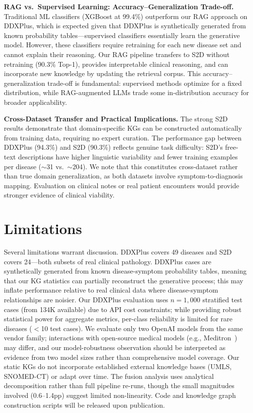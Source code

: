 \documentclass[runningheads]{llncs}
\begin{document}
\textbf{RAG vs.\ Supervised Learning: Accuracy--Generalization Trade-off.}
Traditional ML classifiers (XGBoost at 99.4\%) outperform our RAG approach on DDXPlus, which is expected given that DDXPlus is synthetically generated from known probability tables---supervised classifiers essentially learn the generative model. However, these classifiers require retraining for each new disease set and cannot explain their reasoning. Our RAG pipeline transfers to S2D without retraining (90.3\% Top-1), provides interpretable clinical reasoning, and can incorporate new knowledge by updating the retrieval corpus. This accuracy--generalization trade-off is fundamental: supervised methods optimize for a fixed distribution, while RAG-augmented LLMs trade some in-distribution accuracy for broader applicability.

\textbf{Cross-Dataset Transfer and Practical Implications.}
The strong S2D results demonstrate that domain-specific KGs can be constructed automatically from training data, requiring no expert curation. The performance gap between DDXPlus (94.3\%) and S2D (90.3\%) reflects genuine task difficulty: S2D's free-text descriptions have higher linguistic variability and fewer training examples per disease (${\sim}$31 vs.\ ${\sim}$204). We note that this constitutes cross-dataset rather than true domain generalization, as both datasets involve symptom-to-diagnosis mapping. Evaluation on clinical notes or real patient encounters would provide stronger evidence of clinical viability.

\section{Limitations}
\label{sec:limitations}

Several limitations warrant discussion. DDXPlus covers 49 diseases and S2D covers 24---both subsets of real clinical pathology. DDXPlus cases are synthetically generated from known disease-symptom probability tables, meaning that our KG statistics can partially reconstruct the generative process; this may inflate performance relative to real clinical data where disease-symptom relationships are noisier. Our DDXPlus evaluation uses $n{=}1{,}000$ stratified test cases (from 134K available) due to API cost constraints; while providing robust statistical power for aggregate metrics, per-class reliability is limited for rare diseases ($<$10 test cases). We evaluate only two OpenAI models from the same vendor family; interactions with open-source medical models (e.g., Meditron~\cite{chen2023meditron}) may differ, and our model-robustness observation should be interpreted as evidence from two model sizes rather than comprehensive model coverage. Our static KGs do not incorporate established external knowledge bases (UMLS, SNOMED-CT) or adapt over time. The fusion analysis uses analytical decomposition rather than full pipeline re-runs, though the small magnitudes involved (0.6--1.4pp) suggest limited non-linearity. Code and knowledge graph construction scripts will be released upon publication.
\end{document}
